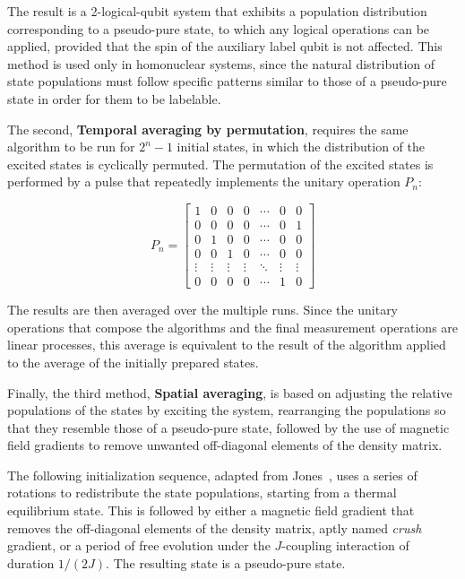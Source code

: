The result is a 2-logical-qubit system that exhibits a population distribution corresponding to a pseudo-pure state, to which any logical operations can be applied, provided that the spin of the auxiliary label qubit is not affected. This method is used only in homonuclear systems, since the natural distribution of state populations must follow specific patterns similar to those of a pseudo-pure state in order for them to be labelable.

The second, \textbf{Temporal averaging by permutation}, requires the same algorithm to be run for \(2^n - 1\) initial states, in which the distribution of the excited states is cyclically permuted. The permutation of the excited states is performed by a pulse that repeatedly implements the unitary operation \(P_n\):

\begin{equation}
P_n=\begin{bmatrix}
1 & 0 & 0 & 0 &\cdots & 0 & 0\\
0 & 0 & 0 & 0 &\cdots & 0 & 1\\
0 & 1 & 0 & 0 &\cdots & 0 & 0\\
0 & 0 & 1 & 0 &\cdots & 0 & 0\\
\vdots & \vdots &\vdots & \vdots & \ddots & \vdots & \vdots\\
0 & 0 & 0 & 0 & \cdots & 1 & 0
\end{bmatrix}
\end{equation}

The results are then averaged over the multiple runs. Since the unitary operations that compose the algorithms and the final measurement operations are linear processes, this average is equivalent to the result of the algorithm applied to the average of the initially prepared states.

Finally, the third method, \textbf{Spatial averaging}, is based on adjusting the relative populations of the states by exciting the system, rearranging the populations so that they resemble those of a pseudo-pure state, followed by the use of magnetic field gradients to remove unwanted off-diagonal elements of the density matrix.

The following initialization sequence, adapted from Jones~\cite{Jones2011quantum}, uses a series of rotations to redistribute the state populations, starting from a thermal equilibrium state. This is followed by either a magnetic field gradient that removes the off-diagonal elements of the density matrix, aptly named \emph{crush} gradient, or a period of free evolution under the \(J\)-coupling interaction of duration \(1/(2J)\). The resulting state is a pseudo-pure state.

